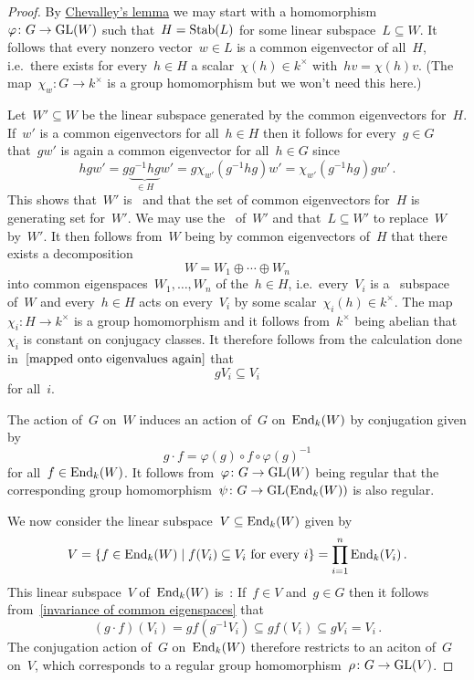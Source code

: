 \begin{proof}
  By \hyperref[chevalley lemma]{Chevalley’s lemma} we may start with a homomorphism~$\varphi \colon G \to \operatorname{GL}(W)$ such that~$H = \operatorname{Stab}(L)$ for some  linear subspace~$L \subseteq W$.
  It follows that every nonzero vector~$w \in L$ is a common eigenvector of all~$H$, i.e.\ there exists for every~$h \in H$ a scalar~$\chi(h) \in k^\times$ with~$h v = \chi(h) v$.
  (The map~$\chi_w \colon G \to k^\times$ is a group homomorphism but we won’t need this here.)
  
  Let~$W' \subseteq W$ be the linear subspace generated by the common eigenvectors for~$H$.
  If~$w'$ is a common eigenvectors for all~$h \in H$ then it follows for every~$g \in G$ that~$g w'$ is again a common eigenvector for all~$h \in G$ since
  \begin{equation}
  \label{mapped onto eigenvalues again}
      h g w'
    = g \underbrace{g^{-1} h g}_{\in H} w'
    = g \chi_{w'}(g^{-1} h g) w'
    = \chi_{w'}(g^{-1} h g) g w' \,.
  \end{equation}
  This shows that~$W'$ is~ and that the set of common eigenvectors for~$H$ is generating set for~$W'$.
  We may use the~ of~$W'$ and that~$L \subseteq W'$ to replace~$W$ by~$W'$.
  It then follows from~$W$ being  by common eigenvectors of~$H$ that there exists a decomposition
  \[
    W = W_1 \oplus \dotsb \oplus W_n
  \]
  into common eigenspaces~$W_1, \dotsc, W_n$ of the~$h \in H$, i.e.\ every~$V_i$ is a~ subspace of~$W$ and every~$h \in H$ acts on every~$V_i$ by some scalar~$\chi_i(h) \in k^\times$.
  The map~$\chi_i \colon H \to k^\times$ is a group homomorphism and it follows from~$k^\times$ being abelian that~$\chi_i$ is constant on conjugacy classes.
  It therefore follows from the calculation done in~$\eqref{mapped onto eigenvalues again}$ that
  \begin{equation}
  \label{invariance of common eigenspaces}
    g V_i \subseteq V_i
  \end{equation}
  for all~$i$.
  
  The action of~$G$ on~$W$ induces an action of~$G$ on~$\operatorname{End}_k(W)$ by conjugation given by
  \[
      g \cdot f
    = \varphi(g) \circ f \circ \varphi(g)^{-1}
  \]
  for all~$f \in \operatorname{End}_k(W)$.
  It follows from~$\varphi \colon G \to \operatorname{GL}(W)$ being regular that the corresponding group homomorphism~$\psi \colon G \to \operatorname{GL}(\operatorname{End}_k(W))$ is also regular.
  
  We now consider the linear subspace~$V \subseteq \operatorname{End}_k(W)$ given by
  \[
      V
    = \left\{
        f \in \End_k(W)
      \suchthat
        \text{$f(V_i) \subseteq V_i$ for every~$i$}
      \right\}
    = \prod_{i=1}^n \End_k(V_i) \,.
  \]
  This linear subspace~$V$ of~$\operatorname{End}_k(W)$ is~:
  If~$f \in V$ and~$g \in G$ then it follows from~\eqref{invariance of common eigenspaces} that
  \[
              (g \cdot f)(V_i)
    =         g f( g^{-1} V_i)
    \subseteq g f( V_i )
    \subseteq g V_i
    =         V_i \,.
  \]
  The conjugation action of~$G$ on~$\operatorname{End}_k(W)$ therefore restricts to an aciton of~$G$ on~$V$, which corresponds to a regular group homomorphism~$\rho \colon G \to \operatorname{GL}(V)$.
  

\end{proof}
